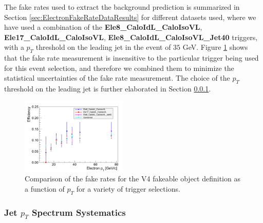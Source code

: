 The fake rates used to extract the background prediction is summarized in Section \ref{sec:ElectronFakeRateDataResults}
for different datasets used, where we have used a combination of the 
{\bf Ele8\_CaloIdL\_CaloIsoVL}, {\bf Ele17\_CaloIdL\_CaloIsoVL}, 
{\bf Ele8\_CaloIdL\_CaloIsoVL\_Jet40} triggers, with a $p_{T}$ threshold on the leading jet in
the event of $35$ GeV. Figure \ref{fig:ele_fr_triggerDependence} shows that the fake rate measurement 
is insensitive to the particular trigger being used for this event selection, and therefore we combined 
them to minimize the statistical uncertainties of the fake rate measurement. The choice of the $p_{T}$
threshold on the leading jet is further elaborated in Section \ref{sec:FakeElectronBkgJetSpectrumSystematics}.


\begin{figure}[!htbp]
\begin{center}
\includegraphics[width=0.45\textwidth]{figures/ElectronFakeRate_DenominatorV4_TriggerDependence.pdf}
\caption{Comparison of the fake rates for the V4 fakeable object definition as a function of $p_T$
for a variety of trigger selections.}
\label{fig:ele_fr_triggerDependence}
\end{center}
\end{figure}


\subsubsection{Jet $p_{T}$ Spectrum Systematics}
\label{sec:FakeElectronBkgJetSpectrumSystematics}

